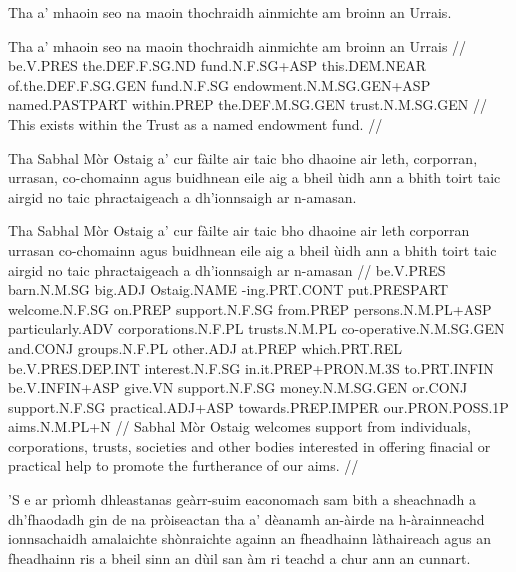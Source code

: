 \documentclass[a4paper,10pt]{article}
\begin{document}
\ex
\begingl
\glpre Tha a' mhaoin seo na maoin thochraidh ainmichte am broinn an Urrais. 

\vspace{4mm}
\gla Tha a' mhaoin seo na maoin thochraidh ainmichte {am broinn} an Urrais  //
\glb be.V.PRES the.DEF.F.SG.ND fund.N.F.SG+ASP this.DEM.NEAR of.the.DEF.F.SG.GEN fund.N.F.SG endowment.N.M.SG.GEN+ASP named.PASTPART within.PREP the.DEF.M.SG.GEN trust.N.M.SG.GEN  //
\glft This exists within the Trust as a named endowment fund. //
\endgl
\xe

\ex
\begingl
\glpre Tha Sabhal Mòr Ostaig a' cur fàilte air taic bho dhaoine air leth, corporran, urrasan, co-chomainn agus buidhnean eile aig a bheil ùidh ann a bhith toirt taic airgid no taic phractaigeach a dh'ionnsaigh ar n-amasan. 

\vspace{4mm}
\gla Tha Sabhal Mòr Ostaig a' cur fàilte air taic bho dhaoine {air leth} corporran urrasan co-chomainn agus buidhnean eile aig a bheil ùidh ann a bhith toirt taic airgid no taic phractaigeach {a dh'ionnsaigh} ar n-amasan  //
\glb be.V.PRES barn.N.M.SG big.ADJ Ostaig.NAME -ing.PRT.CONT put.PRESPART welcome.N.F.SG on.PREP support.N.F.SG from.PREP persons.N.M.PL+ASP particularly.ADV corporations.N.F.PL trusts.N.M.PL co-operative.N.M.SG.GEN and.CONJ groups.N.F.PL other.ADJ at.PREP which.PRT.REL be.V.PRES.DEP.INT interest.N.F.SG in.it.PREP+PRON.M.3S to.PRT.INFIN be.V.INFIN+ASP give.VN support.N.F.SG money.N.M.SG.GEN or.CONJ support.N.F.SG practical.ADJ+ASP towards.PREP.IMPER our.PRON.POSS.1P aims.N.M.PL+N  //
\glft Sabhal Mòr Ostaig welcomes support from individuals, corporations, trusts, societies and other bodies interested in offering finacial or practical help to promote the furtherance of our aims. //
\endgl
\xe

\ex
\begingl
\glpre 'S e ar prìomh dhleastanas geàrr-suim eaconomach sam bith a sheachnadh a dh'fhaodadh gin de na pròiseactan tha a' dèanamh an-àirde na h-àrainneachd ionnsachaidh amalaichte shònraichte againn an fheadhainn làthaireach agus an fheadhainn ris a bheil sinn an dùil san àm ri teachd a chur ann an cunnart. 
\end{document}
